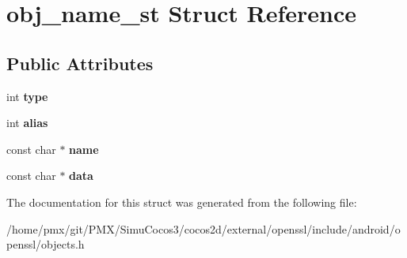 \hypertarget{structobj__name__st}{}\section{obj\+\_\+name\+\_\+st Struct Reference}
\label{structobj__name__st}
\subsection*{Public Attributes}
\begin{DoxyCompactItemize}
\item 
\mbox{\label{structobj__name__st_ac9b1720c0e892bb82abafa95f4c28bfd}} 
int {\bfseries type}
\item 
\mbox{\label{structobj__name__st_a436535b057606678c612d6e0ff87b301}} 
int {\bfseries alias}
\item 
\mbox{\label{structobj__name__st_abf2d75d9ff798fddbe9bab0f9a84946e}} 
const char $\ast$ {\bfseries name}
\item 
\mbox{\label{structobj__name__st_a1c2b948cab95bc59b9d1137a5496dcb0}} 
const char $\ast$ {\bfseries data}
\end{DoxyCompactItemize}


The documentation for this struct was generated from the following file\+:\begin{DoxyCompactItemize}
\item 
/home/pmx/git/\+P\+M\+X/\+Simu\+Cocos3/cocos2d/external/openssl/include/android/openssl/objects.\+h\end{DoxyCompactItemize}

